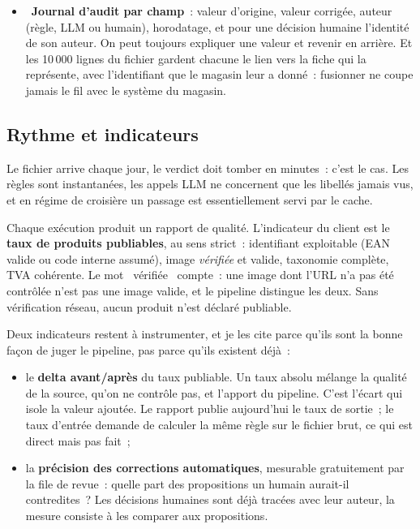 \documentclass[11pt,a4paper]{article}
\newcommand{\ok}{\textcolor{okgreen}{\ding{51}}}
\newcommand{\pa}{\textcolor{amber}{\small\ding{108}}}
\newcommand{\gui}[1]{\guillemotleft{}~#1~\guillemotright{}}
\begin{document}
\begin{itemize}
        relecteur traite les libellés et les taxonomies, seul un administrateur peut valider un
        taux de TVA. Le contrôle n'est pas seulement un bouton grisé dans l'interface, il est
        rejoué par l'API~; le jeton de session est signé et posé dans un cookie inaccessible au
        JavaScript.
  \item \ok\ \textbf{Journal d'audit par champ}~: valeur d'origine, valeur corrigée, auteur (règle,
        LLM ou humain), horodatage, et pour une décision humaine l'identité de son auteur. On peut
        toujours expliquer une valeur et revenir en arrière. Et les 10\,000 lignes du fichier
        gardent chacune le lien vers la fiche qui la représente, avec l'identifiant que le magasin
        leur a donné~: fusionner ne coupe jamais le fil avec le système du magasin.
\end{itemize}

\subsection{Rythme et indicateurs}
Le fichier arrive chaque jour, le verdict doit tomber en minutes~: c'est le cas. Les règles sont
instantanées, les appels LLM ne concernent que les libellés jamais vus, et en régime de croisière
un passage est essentiellement servi par le cache.

Chaque exécution produit un rapport de qualité. L'indicateur du client est le \textbf{taux de
produits publiables}, au sens strict~: identifiant exploitable (EAN valide ou code interne assumé),
image \emph{vérifiée} et valide, taxonomie complète, TVA cohérente. Le mot \gui{vérifiée} compte~:
une image dont l'URL n'a pas été contrôlée n'est pas une image valide, et le pipeline distingue les
deux. Sans vérification réseau, aucun produit n'est déclaré publiable.

\pa{} Deux indicateurs restent à instrumenter, et je les cite parce qu'ils sont la bonne façon de
juger le pipeline, pas parce qu'ils existent déjà~:
\begin{itemize}
  \item le \textbf{delta avant/après} du taux publiable. Un taux absolu mélange la qualité de la
        source, qu'on ne contrôle pas, et l'apport du pipeline. C'est l'écart qui isole la valeur
        ajoutée. Le rapport publie aujourd'hui le taux de sortie~; le taux d'entrée demande de
        calculer la même règle sur le fichier brut, ce qui est direct mais pas fait~;
  \item la \textbf{précision des corrections automatiques}, mesurable gratuitement par la file de
        revue~: quelle part des propositions un humain aurait-il contredites~? Les décisions
        humaines sont déjà tracées avec leur auteur, la mesure consiste à les comparer aux
        propositions.
\end{itemize}
\end{document}
